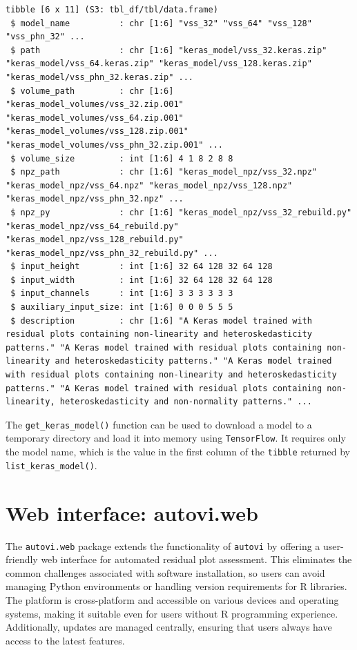 \documentclass[
doublespace,
  times]{anzsauth}
\begin{document}
\begin{verbatim}
tibble [6 x 11] (S3: tbl_df/tbl/data.frame)
 $ model_name          : chr [1:6] "vss_32" "vss_64" "vss_128" "vss_phn_32" ...
 $ path                : chr [1:6] "keras_model/vss_32.keras.zip" "keras_model/vss_64.keras.zip" "keras_model/vss_128.keras.zip" "keras_model/vss_phn_32.keras.zip" ...
 $ volume_path         : chr [1:6] "keras_model_volumes/vss_32.zip.001" "keras_model_volumes/vss_64.zip.001" "keras_model_volumes/vss_128.zip.001" "keras_model_volumes/vss_phn_32.zip.001" ...
 $ volume_size         : int [1:6] 4 1 8 2 8 8
 $ npz_path            : chr [1:6] "keras_model_npz/vss_32.npz" "keras_model_npz/vss_64.npz" "keras_model_npz/vss_128.npz" "keras_model_npz/vss_phn_32.npz" ...
 $ npz_py              : chr [1:6] "keras_model_npz/vss_32_rebuild.py" "keras_model_npz/vss_64_rebuild.py" "keras_model_npz/vss_128_rebuild.py" "keras_model_npz/vss_phn_32_rebuild.py" ...
 $ input_height        : int [1:6] 32 64 128 32 64 128
 $ input_width         : int [1:6] 32 64 128 32 64 128
 $ input_channels      : int [1:6] 3 3 3 3 3 3
 $ auxiliary_input_size: int [1:6] 0 0 0 5 5 5
 $ description         : chr [1:6] "A Keras model trained with residual plots containing non-linearity and heteroskedasticity patterns." "A Keras model trained with residual plots containing non-linearity and heteroskedasticity patterns." "A Keras model trained with residual plots containing non-linearity and heteroskedasticity patterns." "A Keras model trained with residual plots containing non-linearity, heteroskedasticity and non-normality patterns." ...
\end{verbatim}

The \texttt{get\_keras\_model()} function can be used to download a
model to a temporary directory and load it into memory using
\texttt{TensorFlow}. It requires only the model name, which is the value
in the first column of the \texttt{tibble} returned by
\texttt{list\_keras\_model()}.

\section{Web interface: autovi.web}\label{sec-autovi-web}

The \texttt{autovi.web} package extends the functionality of
\texttt{autovi} by offering a user-friendly web interface for automated
residual plot assessment. This eliminates the common challenges
associated with software installation, so users can avoid managing
Python environments or handling version requirements for R libraries.
The platform is cross-platform and accessible on various devices and
operating systems, making it suitable even for users without R
programming experience. Additionally, updates are managed centrally,
ensuring that users always have access to the latest features.
\end{document}
